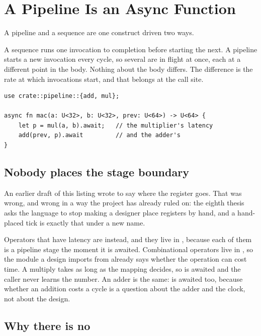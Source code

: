 \section{A Pipeline Is an Async Function}
\label{sec:e-pipeline}

A pipeline and a sequence are one construct driven two ways.

A sequence runs one invocation to completion before starting the next. A
pipeline starts a new invocation every cycle, so several are in flight at
once, each at a different point in the body. Nothing about the body
differs. The difference is the rate at which invocations start, and that
belongs at the call site.

\begin{lstlisting}[caption={A pipeline, a sequence and a parallel process, all at once. Nobody placed the stage boundary: it is where an operator with latency is awaited.},label={lst:pipeline}]
use crate::pipeline::{add, mul};

async fn mac(a: U<32>, b: U<32>, prev: U<64>) -> U<64> {
    let p = mul(a, b).await;   // the multiplier's latency
    add(prev, p).await         // and the adder's
}
\end{lstlisting}

\subsection{Nobody places the stage boundary}

An earlier draft of this listing wrote  to say where
the register goes. That was wrong, and wrong in a way the project has
already ruled on: the eighth thesis~\cite{theses} asks the language to
stop making a designer place registers by hand, and a hand-placed tick is
exactly that under a new name.

Operators that have latency are  instead, and they live in
, because each of them is a pipeline stage the
moment it is awaited. Combinational operators live in
, so the module a design imports from already says
whether the operation can cost time. A multiply takes as long as the
mapping decides, so
 is awaited and the caller never learns the number. An adder is
the same:  is awaited too, because whether an addition costs a
cycle is a question about the adder and the clock, not about the design.

\subsection{Why there is no }

